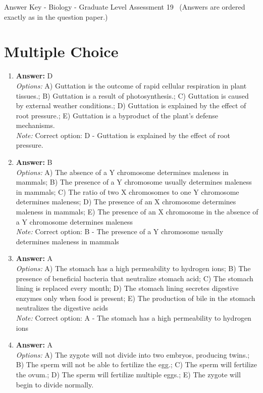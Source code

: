\documentclass[12pt]{article}
\begin{document}
\begin{center}
Answer Key - Biology - Graduate Level Assessment 19 \
\small (Answers are ordered exactly as in the question paper.)
\end{center}

\section*{Multiple Choice}
\begin{enumerate}[label=\arabic*.]
\item \textbf{Answer:} D
\\ \textit{Options:} A) Guttation is the outcome of rapid cellular respiration in plant tissues.; B) Guttation is a result of photosynthesis.; C) Guttation is caused by external weather conditions.; D) Guttation is explained by the effect of root pressure.; E) Guttation is a byproduct of the plant's defense mechanisms.
\\ \textit{Note:} Correct option: D - Guttation is explained by the effect of root pressure.
\item \textbf{Answer:} B
\\ \textit{Options:} A) The absence of a Y chromosome determines maleness in mammals; B) The presence of a Y chromosome usually determines maleness in mammals; C) The ratio of two X chromosomes to one Y chromosome determines maleness; D) The presence of an X chromosome determines maleness in mammals; E) The presence of an X chromosome in the absence of a Y chromosome determines maleness
\\ \textit{Note:} Correct option: B - The presence of a Y chromosome usually determines maleness in mammals
\item \textbf{Answer:} A
\\ \textit{Options:} A) The stomach has a high permeability to hydrogen ions; B) The presence of beneficial bacteria that neutralize stomach acid; C) The stomach lining is replaced every month; D) The stomach lining secretes digestive enzymes only when food is present; E) The production of bile in the stomach neutralizes the digestive acids
\\ \textit{Note:} Correct option: A - The stomach has a high permeability to hydrogen ions
\item \textbf{Answer:} A
\\ \textit{Options:} A) The zygote will not divide into two embryos, producing twins.; B) The sperm will not be able to fertilize the egg.; C) The sperm will fertilize the ovum.; D) The sperm will fertilize multiple eggs.; E) The zygote will begin to divide normally.

\end{enumerate}
\end{document}
